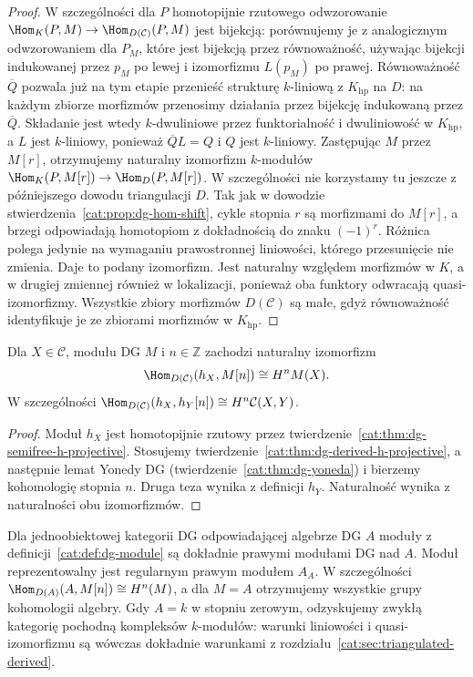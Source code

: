 \begin{proof}
W szczególności dla $P$ homotopijnie rzutowego odwzorowanie $\Hom_K(P,M)\to\Hom_{D(\mathcal C)}(P,M)$ jest bijekcją: porównujemy je z analogicznym odwzorowaniem dla $P_M$, które jest bijekcją przez równoważność, używając bijekcji indukowanej przez $p_M$ po lewej i izomorfizmu $L(p_M)$ po prawej. Równoważność $\overline Q$ pozwala już na tym etapie przenieść strukturę $k$-liniową z $K_{\mathrm{hp}}$ na $D$: na każdym zbiorze morfizmów przenosimy działania przez bijekcję indukowaną przez $\overline Q$. Składanie jest wtedy $k$-dwuliniowe przez funktorialność i dwuliniowość w $K_{\mathrm{hp}}$, a $L$ jest $k$-liniowy, ponieważ $\overline QL=Q$ i $Q$ jest $k$-liniowy. Zastępując $M$ przez $M[r]$, otrzymujemy naturalny izomorfizm $k$-modułów $\Hom_K(P,M[r])\to\Hom_D(P,M[r])$. W szczególności nie korzystamy tu jeszcze z późniejszego dowodu triangulacji $D$. Tak jak w dowodzie stwierdzenia~\ref{cat:prop:dg-hom-shift}, cykle stopnia $r$ są morfizmami do $M[r]$, a brzegi odpowiadają homotopiom z dokładnością do znaku $(-1)^r$. Różnica polega jedynie na wymaganiu prawostronnej liniowości, którego przesunięcie nie zmienia. Daje to podany izomorfizm. Jest naturalny względem morfizmów w $K$, a w drugiej zmiennej również w lokalizacji, ponieważ oba funktory odwracają quasi-izomorfizmy. Wszystkie zbiory morfizmów $D(\mathcal C)$ są małe, gdyż równoważność identyfikuje je ze zbiorami morfizmów w $K_{\mathrm{hp}}$.
\end{proof}

\begin{wniosek}\label{cat:cor:dg-derived-yoneda}
Dla $X\in\mathcal C$, modułu DG $M$ i $n\in\mathbb Z$ zachodzi naturalny izomorfizm
\[
 \Hom_{D(\mathcal C)}(h_X,M[n])\cong H^nM(X).
\]
W szczególności
$\Hom_{D(\mathcal C)}(h_X,h_Y[n])\cong H^n\mathcal C(X,Y)$.
\end{wniosek}
\begin{proof}
Moduł $h_X$ jest homotopijnie rzutowy przez twierdzenie~\ref{cat:thm:dg-semifree-h-projective}. Stosujemy twierdzenie~\ref{cat:thm:dg-derived-h-projective}, a następnie lemat Yonedy DG (twierdzenie~\ref{cat:thm:dg-yoneda}) i bierzemy kohomologię stopnia $n$. Druga teza wynika z definicji $h_Y$. Naturalność wynika z naturalności obu izomorfizmów.
\end{proof}

\begin{przyklad}\label{cat:ex:dg-algebra-derived}
Dla jednoobiektowej kategorii DG odpowiadającej algebrze DG $A$ moduły z definicji~\ref{cat:def:dg-module} są dokładnie prawymi modułami DG nad $A$. Moduł reprezentowalny jest regularnym prawym modułem $A_A$. W szczególności $\Hom_{D(A)}(A,M[n])\cong H^n(M)$, a dla $M=A$ otrzymujemy wszystkie grupy kohomologii algebry. Gdy $A=k$ w stopniu zerowym, odzyskujemy zwykłą kategorię pochodną kompleksów $k$-modułów: warunki liniowości i quasi-izomorfizmu są wówczas dokładnie warunkami z rozdziału~\ref{cat:sec:triangulated-derived}.
\end{przyklad}

